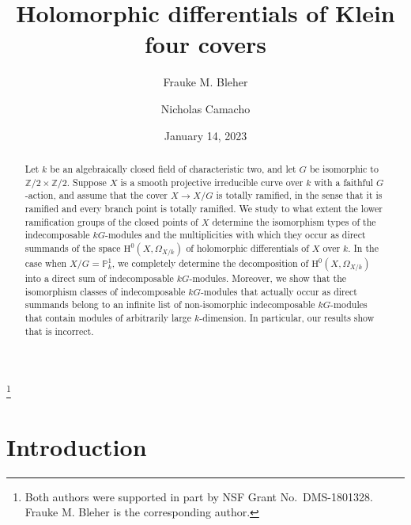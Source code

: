 \documentclass{amsart}
\numberwithin{equation}{section}
\numberwithin{table}{section}
\theoremstyle{plain}
\theoremstyle{definition}
\theoremstyle{remark}
\newcommand{\HH}{\mathrm{H}}
\begin{document}
 

\title{Holomorphic differentials of Klein four covers}

\author{Frauke M. Bleher \and Nicholas Camacho}
\address{Department of Mathematics\\University of Iowa\\
14 MacLean Hall\\Iowa City, IA 52242-1419\\ U.S.A.}
\thanks{Both authors were supported in part by NSF Grant No.\ DMS-1801328. Frauke M. Bleher is the corresponding author.}


\date{January 14, 2023}


\begin{abstract}
Let $k$ be an algebraically closed field of characteristic two, and let $G$ be isomorphic to $\mathbb{Z}/2\times\mathbb{Z}/2$. Suppose $X$ is a smooth projective irreducible curve over $k$ with a faithful $G$-action, and assume that the cover $X\to X/G$ is totally ramified, in the sense that it is ramified and every branch point is totally ramified. 
We study to what extent the lower ramification groups of the closed points of $X$ 
determine the isomorphism types of the indecomposable $kG$-modules and the multiplicities with which they occur as direct summands of the space $\HH^0(X,\Omega_{X/k})$ of holomorphic differentials of $X$ over $k$. 
In the case when $X/G=\mathbb{P}^1_k$, we completely determine the decomposition of $\HH^0(X,\Omega_{X/k})$ into a direct sum of indecomposable $kG$-modules. 
Moreover, we show that the isomorphism classes of indecomposable $kG$-modules that actually occur as direct summands belong to an infinite list of non-isomorphic indecomposable $kG$-modules that contain modules of arbitrarily large $k$-dimension. In particular, our results show that \cite[Theorem 6.4]{MarquesWard2018} is incorrect.
\end{abstract}

\maketitle


\section{Introduction}
\label{s:intro}
\end{document}
